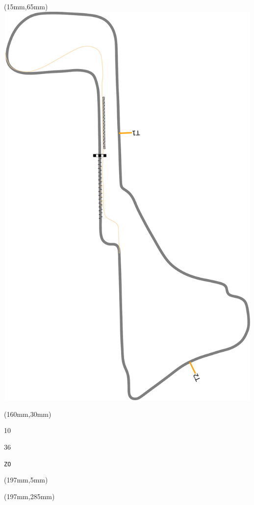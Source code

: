 \begin{textblock*}{185mm}(15mm,65mm)%
\centering
\mbox{\includegraphics[width=185mm,height=210mm,keepaspectratio]{PT/ZO.pdf}}
\end{textblock*}
\begin{textblock*}{40mm}(160mm,30mm)%
\Large
\par{} 
\par10 
\par36 
\par\hfill\tiny\tt ZO\\
\end{textblock*}
\begin{textblock*}{20mm}(197mm,5mm)%
\fbox{\thepage}
\label{ZO}
\end{textblock*}
\begin{textblock*}{20mm}(197mm,285mm)%
\fbox{\thepage}
\end{textblock*}

\null\newpage
